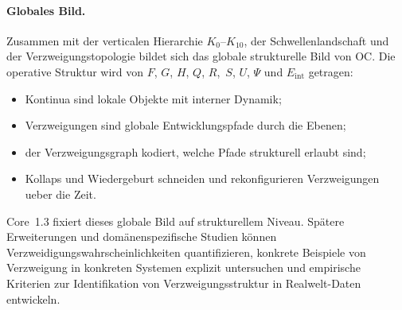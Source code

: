 \paragraph{Globales Bild.}
Zusammen mit der verticalen Hierarchie \(K_0\)–\(K_{10}\), der
Schwellenlandschaft und der Verzweigungstopologie bildet sich das globale
strukturelle Bild von OC.
Die operative Struktur wird von \(F\), \(G\), \(H\), \(Q\), \(R\),\
\(S\), \(U\), \(\Psi\) und \(E_{\mathrm{int}}\) getragen:
\begin{itemize}
  \item Kontinua sind lokale Objekte mit interner Dynamik;
  \item Verzweigungen sind globale Entwicklungspfade durch die Ebenen;
  \item der Verzweigungsgraph kodiert, welche Pfade strukturell erlaubt sind;
  \item Kollaps und Wiedergeburt schneiden und rekonfigurieren Verzweigungen
        ueber die Zeit.
\end{itemize}

Core~1.3 fixiert dieses globale Bild auf strukturellem Niveau. Spätere Erweiterungen
und domänenspezifische Studien können Verzweidigungswahrscheinlichkeiten
quantifizieren, konkrete Beispiele von Verzweigung in konkreten Systemen explizit
untersuchen und empirische Kriterien zur Identifikation von Verzweigungsstruktur
in Realwelt-Daten entwickeln.


